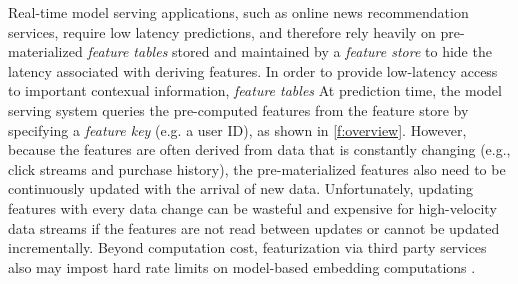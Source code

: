 






Real-time model serving applications, such as online news recommendation services, require low latency predictions, and therefore rely heavily on pre-materialized \emph{feature tables} stored and maintained by a \emph{feature store} to hide the latency associated with deriving features. 
In order to provide low-latency access to important contexual information, \emph{feature tables}
At prediction time, the model serving system 
queries the pre-computed features from the
feature store by specifying a \textit{feature key} (e.g. a user ID), as shown in \cref{f:overview}. 
However, because the features are often derived from data that is constantly changing (e.g., click streams and purchase history), the pre-materialized features also need to be continuously updated with the arrival of new data.
Unfortunately, updating features with every data change can be wasteful and  expensive for high-velocity data streams if the features are not read between updates or cannot be updated incrementally. Beyond computation cost, featurization via third party services also may impost hard rate limits on model-based embedding computations \cite{openai, cohere}. 





